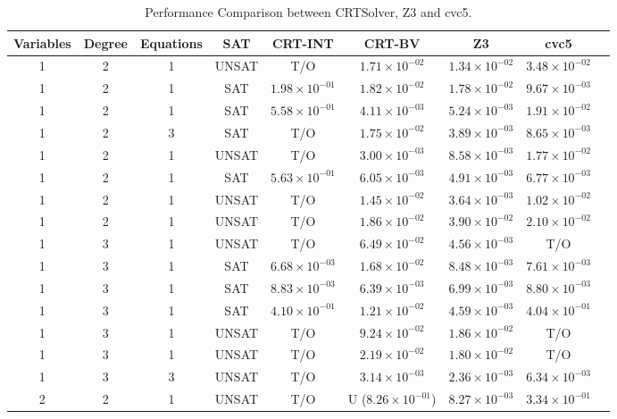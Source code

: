 \begin{table}
  \caption{Performance Comparison between CRTSolver, Z3 and cvc5.}
  \label{table:results}
  \begin{tabular}{ccccccccc}
    \toprule
    Variables & Degree & Equations & SAT & CRT-INT & CRT-BV & Z3 & cvc5 \\
    \midrule
1 & 2 & 1 & UNSAT & T/O & $1.71 \times 10^{-02}$ & $1.34 \times 10^{-02}$ & $3.48 \times 10^{-02}$ \\
1 & 2 & 1 & SAT & $1.98 \times 10^{-01}$ & $1.82 \times 10^{-02}$ & $1.78 \times 10^{-02}$ & $9.67 \times 10^{-03}$ \\
1 & 2 & 1 & SAT & $5.58 \times 10^{-01}$ & $4.11 \times 10^{-03}$ & $5.24 \times 10^{-03}$ & $1.91 \times 10^{-02}$ \\
1 & 2 & 3 & SAT & T/O & $1.75 \times 10^{-02}$ & $3.89 \times 10^{-03}$ & $8.65 \times 10^{-03}$ \\
1 & 2 & 1 & UNSAT & T/O & $3.00 \times 10^{-03}$ & $8.58 \times 10^{-03}$ & $1.77 \times 10^{-02}$ \\
1 & 2 & 1 & SAT & $5.63 \times 10^{-01}$ & $6.05 \times 10^{-03}$ & $4.91 \times 10^{-03}$ & $6.77 \times 10^{-03}$ \\
1 & 2 & 1 & UNSAT & T/O & $1.45 \times 10^{-02}$ & $3.64 \times 10^{-03}$ & $1.02 \times 10^{-02}$ \\
1 & 2 & 1 & UNSAT & T/O & $1.86 \times 10^{-02}$ & $3.90 \times 10^{-02}$ & $2.10 \times 10^{-02}$ \\
1 & 3 & 1 & UNSAT & T/O & $6.49 \times 10^{-02}$ & $4.56 \times 10^{-03}$ & T/O \\
1 & 3 & 1 & SAT & $6.68 \times 10^{-03}$ & $1.68 \times 10^{-02}$ & $8.48 \times 10^{-03}$ & $7.61 \times 10^{-03}$ \\
1 & 3 & 1 & SAT & $8.83 \times 10^{-03}$ & $6.39 \times 10^{-03}$ & $6.99 \times 10^{-03}$ & $8.80 \times 10^{-03}$ \\
1 & 3 & 1 & SAT & $4.10 \times 10^{-01}$ & $1.21 \times 10^{-02}$ & $4.59 \times 10^{-03}$ & $4.04 \times 10^{-01}$ \\
1 & 3 & 1 & UNSAT & T/O & $9.24 \times 10^{-02}$ & $1.86 \times 10^{-02}$ & T/O \\
1 & 3 & 1 & UNSAT & T/O & $2.19 \times 10^{-02}$ & $1.80 \times 10^{-02}$ & T/O \\
1 & 3 & 3 & UNSAT & T/O & $3.14 \times 10^{-03}$ & $2.36 \times 10^{-03}$ & $6.34 \times 10^{-03}$ \\
2 & 2 & 1 & UNSAT & T/O & U ($8.26 \times 10^{-01}$) & $8.27 \times 10^{-03}$ & $3.34 \times 10^{-01}$ \\

\end{tabular}
\end{table}
